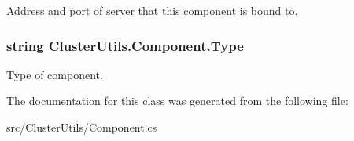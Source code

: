 Address and port of server that this component is bound to. 

\hypertarget{class_cluster_utils_1_1_component_a6ce36edcda387dbfa14f642e61f9275e}{}
\subsubsection[{Type}]{\setlength{\rightskip}{0pt plus 5cm}string Cluster\+Utils.\+Component.\+Type\hspace{0.3cm}{\ttfamily [protected]}}\label{class_cluster_utils_1_1_component_a6ce36edcda387dbfa14f642e61f9275e}


Type of component. 



The documentation for this class was generated from the following file\+:\begin{DoxyCompactItemize}
\item 
src/\+Cluster\+Utils/Component.\+cs\end{DoxyCompactItemize}
